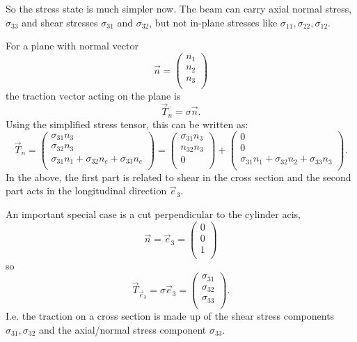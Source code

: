 So the stress state is much simpler now.
The beam can carry axial normal stress, $\sigma_{33}$ and shear stresses $\sigma_{31}$ and $\sigma_{32}$, but not in-plane stresses like $\sigma_{11}, \sigma_{22}, \sigma_{12}$.

For a plane with normal vector
\begin{equation*}
  \Vec{n} = \begin{pmatrix}
    n_1\\
  n_2\\
  n_3\\
  \end{pmatrix}
\end{equation*}
the traction vector acting on the plane is
\begin{equation*}
  \Vec{T}_n = \sigma \Vec{n}
.\end{equation*}
Using the simplified stress tensor, this can be written as:
\begin{equation*}
  \Vec{T}_n = \begin{pmatrix}
    \sigma_{31}n_3\\
  \sigma_{32}n_3\\
  \sigma_{31} n_1 + \sigma_{32} n_e + \sigma_{33} n_e\\
  \end{pmatrix} = \begin{pmatrix}
    \sigma_{31}n_3\\
  n_{32}n_3\\
  0\\
  \end{pmatrix} + \begin{pmatrix}
    0\\
  0\\
  \sigma_{31}n_1 + \sigma_{32} n_2 + \sigma_{33} n_3\\
  \end{pmatrix}
.\end{equation*}
In the above, the first part is related to shear in the cross section and the second part acts in the longitudinal direction $\Vec{e}_3$. 

An important special case is a cut perpendicular to the cylinder acis,
\begin{equation*}
  \Vec{n} = \Vec{e}_3 = \begin{pmatrix}
    0\\
  0\\
  1\\
  \end{pmatrix}
\end{equation*}
so
\begin{equation*}
  \Vec{T}_{\Vec{e}_3} = \sigma \Vec{e}_3 = \begin{pmatrix}
    \sigma_{31}\\
  \sigma_{32}\\
  \sigma_{33}\\
  \end{pmatrix}
.\end{equation*}
I.e. the traction on a cross section is made up of the shear stress components $\sigma_{31}, \sigma_{32}$ and the axial/normal stress component $\sigma_{33}$.

